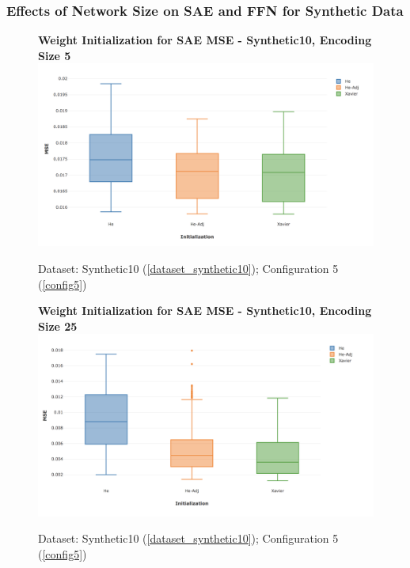 \documentclass[a4paper,11pt,oneside]{article}
\theoremstyle{plain}
\theoremstyle{definition}
\begin{document}
\subsubsection{Effects of Network Size on SAE and FFN for Synthetic Data}\label{appendix_sae_init}

\begin{figure}[H]
	\centering
	\textbf{Weight Initialization for SAE MSE - Synthetic10, Encoding Size 5} 
	\includegraphics[scale=0.35]{images/results/init/Synthetic10_5.png}
	\caption{Dataset: Synthetic10 (\ref{dataset_synthetic10}); Configuration 5 (\ref{config5})}
	\label{figure-results_init_synthetic10_25}
\end{figure}

\begin{figure}[H]
	\centering
	\textbf{Weight Initialization for SAE MSE - Synthetic10, Encoding Size 25} 
	\includegraphics[scale=0.35]{images/results/init/Synthetic10_25.png}
	\caption{Dataset: Synthetic10 (\ref{dataset_synthetic10}); Configuration 5 (\ref{config5})}
	\label{figure-results_init_synthetic10_5}
\end{figure}
\end{document}
